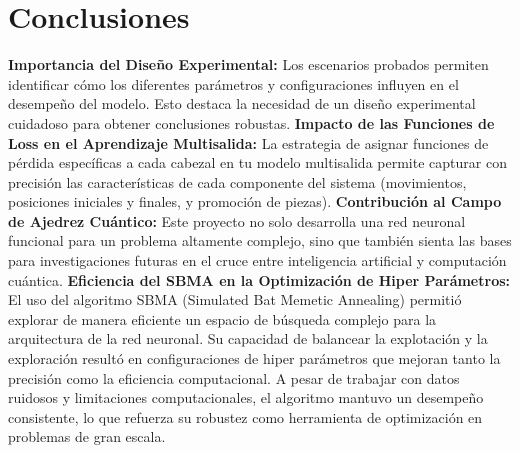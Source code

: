 \section{Conclusiones}
\textbf{Importancia del Diseño Experimental:}\newline
Los escenarios probados permiten identificar cómo los diferentes parámetros y configuraciones influyen en el desempeño del modelo. Esto destaca la necesidad de un diseño experimental cuidadoso para obtener conclusiones robustas.\newline
\textbf{Impacto de las Funciones de Loss en el Aprendizaje Multisalida:}
La estrategia de asignar funciones de pérdida específicas a cada cabezal en tu modelo multisalida permite capturar con precisión las características de cada componente del sistema (movimientos, posiciones iniciales y finales, y promoción de piezas).\newline
\textbf{Contribución al Campo de Ajedrez Cuántico:}\newline
Este proyecto no solo desarrolla una red neuronal funcional para un problema altamente complejo, sino que también sienta las bases para investigaciones futuras en el cruce entre inteligencia artificial y computación cuántica.\newline
\textbf{Eficiencia del SBMA en la Optimización de Hiper Parámetros:}\newline
El uso del algoritmo SBMA (Simulated Bat Memetic Annealing) permitió explorar de manera eficiente un espacio de búsqueda complejo para la arquitectura de la red neuronal. Su capacidad de balancear la explotación y la exploración resultó en configuraciones de hiper parámetros que mejoran tanto la precisión como la eficiencia computacional.
A pesar de trabajar con datos ruidosos y limitaciones computacionales, el algoritmo mantuvo un desempeño consistente, lo que refuerza su robustez como herramienta de optimización en problemas de gran escala.
